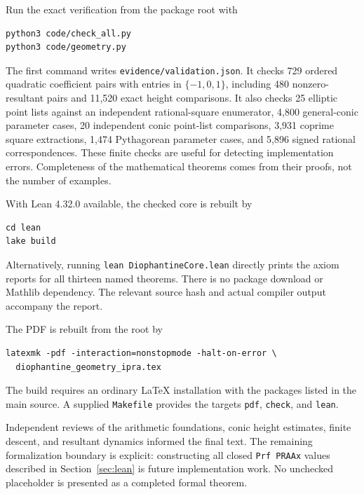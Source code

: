 Run the exact verification from the package root with
\begin{verbatim}
python3 code/check_all.py
python3 code/geometry.py
\end{verbatim}
The first command writes \texttt{evidence/validation.json}. It checks 729
ordered quadratic coefficient pairs with entries in $\{-1,0,1\}$, including
480 nonzero-resultant pairs and 11,520 exact height comparisons. It also
checks 25 elliptic point lists against an independent rational-square
enumerator, 4,800 general-conic parameter cases, 20 independent conic
point-list comparisons, 3,931 coprime square extractions, 1,474 Pythagorean
parameter cases, and 5,896 signed rational correspondences. These finite
checks are useful for detecting implementation errors. Completeness of the
mathematical theorems comes from their proofs, not the number of examples.

With Lean 4.32.0 available, the checked core is rebuilt by
\begin{verbatim}
cd lean
lake build
\end{verbatim}
Alternatively, running \texttt{lean DiophantineCore.lean} directly prints
the axiom reports for all thirteen named theorems. There is no package
download or Mathlib dependency. The relevant source hash and actual
compiler output accompany the report.

The PDF is rebuilt from the root by
\begin{verbatim}
latexmk -pdf -interaction=nonstopmode -halt-on-error \
  diophantine_geometry_ipra.tex
\end{verbatim}
The build requires an ordinary LaTeX installation with the packages listed
in the main source. A supplied \texttt{Makefile} provides the targets
\texttt{pdf}, \texttt{check}, and \texttt{lean}.

Independent reviews of the arithmetic foundations, conic height estimates,
finite descent, and resultant dynamics informed the final text. The
remaining formalization boundary is explicit: constructing all closed
\texttt{Prf PRAAx} values described in Section~\ref{sec:lean} is future
implementation work. No unchecked placeholder is presented as a completed
formal theorem.
